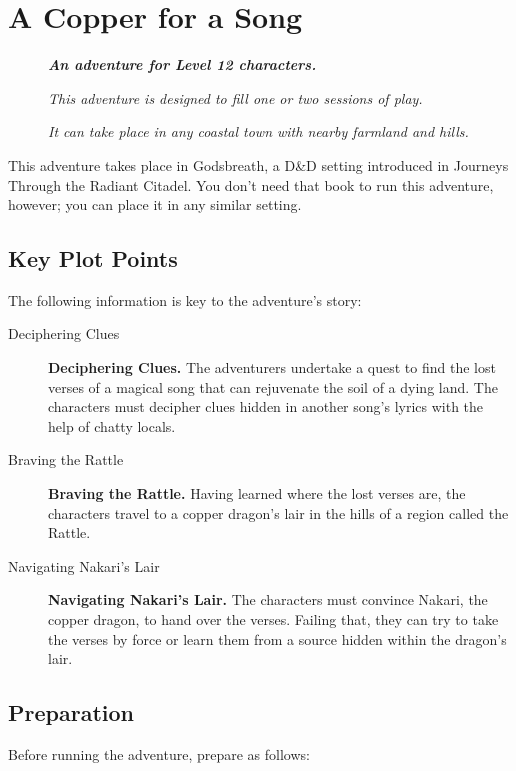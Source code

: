\documentclass[letterpaper, 11pt, twocolumn]{dndbook}
\begin{document}
\chapter{A Copper for a Song}\label{ch:a-copper-for-a-song-2-2}

\begin{description}
\item[] \textit{ \textbf{An adventure for Level 12 characters.}}
\item[] \textit{This adventure is designed to fill one or two sessions of play.}
\item[] \textit{It can take place in any coastal town with nearby farmland and hills.}
\end{description}
This adventure takes place in Godsbreath, a D\&D setting introduced in Journeys Through the Radiant Citadel. You don't need that book to run this adventure, however; you can place it in any similar setting.
\section{Key Plot Points}

The following information is key to the adventure's story:

\begin{description}
\item[Deciphering Clues] \textbf{Deciphering Clues.} The adventurers undertake a quest to find the lost verses of a magical song that can rejuvenate the soil of a dying land. The characters must decipher clues hidden in another song's lyrics with the help of chatty locals.
\item[Braving the Rattle] \textbf{Braving the Rattle.} Having learned where the lost verses are, the characters travel to a copper dragon's lair in the hills of a region called the Rattle.
\item[Navigating Nakari's Lair] \textbf{Navigating Nakari's Lair.} The characters must convince Nakari, the copper dragon, to hand over the verses. Failing that, they can try to take the verses by force or learn them from a source hidden within the dragon's lair.
\end{description}
\section{Preparation}

Before running the adventure, prepare as follows:
\end{document}
